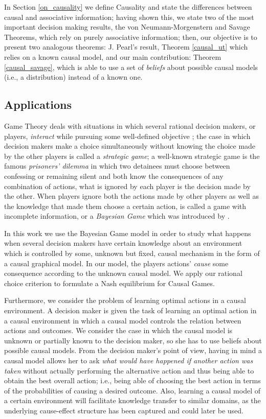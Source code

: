 \documentclass[review]{elsarticle}
\begin{document}
In Section \ref{on_causality} we define Causality and state the differences between causal and associative information; having shown this, we state two of the most important decision making results, the von Neumann-Morgenstern and Savage Theorems, which rely on purely associative information; then, our objective is to present two analogous theorems: J. Pearl's result, Theorem \ref{causal_ut} which relies on a known causal model, and our main contribution: Theorem \ref{causal_savage}, which is able to use a set of \textit{beliefs} about possible causal models (i.e., a distribution) instead of a known one.

\subsection{Applications}
Game Theory deals with situations in which several rational decision makers, or players, \textit{interact} while pursuing some well-defined objective \citep{osborne1994course}; the case in which decision makers make a choice simultaneously without knowing the choice made by the other players is called a \textit{strategic game}; a well-known strategic game is the famous \textit{prisoners' dilemma} in which two detainees must choose between confessing or remaining silent and both know the consequences of any combination of actions, what is ignored by each player is the decision made by the other. When players ignore both the actions made by other players as well as the knowledge that made them choose a certain action, is called a game with incomplete information, or a \textit{Bayesian Game} which was introduced by \cite{harsanyi1967games1,harsanyi1968games2,harsanyi1968games3}. 

In this work we use the Bayesian Game model in order to study what happens when several decision makers have certain knowledge about an environment which is controlled by some, unknown but fixed, causal mechanism in the form of a causal graphical model. In our model, the players actions' \textit{cause} some consequence according to the unknown causal model. We apply our rational choice criterion to formulate a Nash equilibrium for Causal Games.

Furthermore, we consider the problem of learning optimal actions in a causal environment. A decision maker is given the task of learning an optimal action in a causal environment in which a causal model controls the relation between actions and outcomes. We consider the case in which the causal model is unknown or partially known to the decision maker, so she has to use beliefs about possible causal models. From the decision maker's point of view, having in mind a causal model allows her to ask \textit{what would have happened if another action was taken} without actually performing the alternative action and thus being able to obtain the best overall action; i.e., being able of choosing the best action in terms of the probabilities of causing a desired outcome. Also, learning a causal model of a certain environment will facilitate knowledge transfer to similar domains, as the underlying cause-effect structure has been captured and could later be used.
\end{document}
